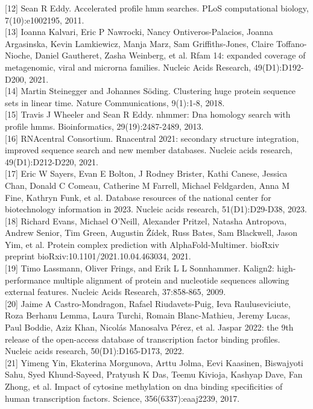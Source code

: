 \documentclass[10pt]{article}
\begin{document}
[12] Sean R Eddy. Accelerated profile hmm searches. PLoS computational biology, 7(10):e1002195, 2011.\\[0pt]
[13] Ioanna Kalvari, Eric P Nawrocki, Nancy Ontiveros-Palacios, Joanna Argasinska, Kevin Lamkiewicz, Manja Marz, Sam Griffiths-Jones, Claire Toffano-Nioche, Daniel Gautheret, Zasha Weinberg, et al. Rfam 14: expanded coverage of metagenomic, viral and microrna families. Nucleic Acids Research, 49(D1):D192-D200, 2021.\\[0pt]
[14] Martin Steinegger and Johannes Söding. Clustering huge protein sequence sets in linear time. Nature Communications, 9(1):1-8, 2018.\\[0pt]
[15] Travis J Wheeler and Sean R Eddy. nhmmer: Dna homology search with profile hmms. Bioinformatics, 29(19):2487-2489, 2013.\\[0pt]
[16] RNAcentral Consortium. Rnacentral 2021: secondary structure integration, improved sequence search and new member databases. Nucleic acids research, 49(D1):D212-D220, 2021.\\[0pt]
[17] Eric W Sayers, Evan E Bolton, J Rodney Brister, Kathi Canese, Jessica Chan, Donald C Comeau, Catherine M Farrell, Michael Feldgarden, Anna M Fine, Kathryn Funk, et al. Database resources of the national center for biotechnology information in 2023. Nucleic acids research, 51(D1):D29-D38, 2023.\\[0pt]
[18] Richard Evans, Michael O'Neill, Alexander Pritzel, Natasha Antropova, Andrew Senior, Tim Green, Augustin Žídek, Russ Bates, Sam Blackwell, Jason Yim, et al. Protein complex prediction with AlphaFold-Multimer. bioRxiv preprint bioRxiv:10.1101/2021.10.04.463034, 2021.\\[0pt]
[19] Timo Lassmann, Oliver Frings, and Erik L L Sonnhammer. Kalign2: high-performance multiple alignment of protein and nucleotide sequences allowing external features. Nucleic Acids Research, 37:858-865, 2009.\\[0pt]
[20] Jaime A Castro-Mondragon, Rafael Riudavets-Puig, Ieva Rauluseviciute, Roza Berhanu Lemma, Laura Turchi, Romain Blanc-Mathieu, Jeremy Lucas, Paul Boddie, Aziz Khan, Nicolás Manosalva Pérez, et al. Jaspar 2022: the 9th release of the open-access database of transcription factor binding profiles. Nucleic acids research, 50(D1):D165-D173, 2022.\\[0pt]
[21] Yimeng Yin, Ekaterina Morgunova, Arttu Jolma, Eevi Kaasinen, Biswajyoti Sahu, Syed Khund-Sayeed, Pratyush K Das, Teemu Kivioja, Kashyap Dave, Fan Zhong, et al. Impact of cytosine methylation on dna binding specificities of human transcription factors. Science, 356(6337):eaaj2239, 2017.\\[0pt]
\end{document}
